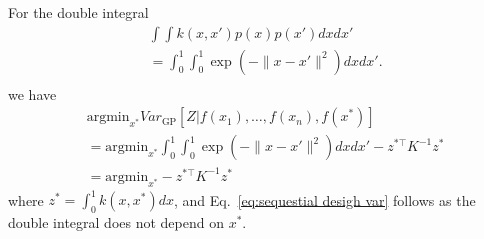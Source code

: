 For the double integral
\begin{align}
    & \int \int k(x,x')p(x)p(x')dxdx' \\
    & = \int_0^1 \int_0^1 \exp(-\|x - x'\|^2) dx dx'. \\
\label{eq:double-integral}
\end{align}
we have
\begin{align}
    & \mbox{argmin}_{x^*} Var_{\mbox{GP}}\left[Z | f(x_1), \ldots, f(x_n), f(x^*) \right]  \\
    & = \mbox{argmin}_{x^*}  \int_0^1 \int_0^1 \exp(-\|x - x'\|^2) dx dx' - z^{*\top}K^{-1}z^* \\
 & = \mbox{argmin}_{x^*}  - z^{*\top}K^{-1}z^*
 \label{eq:sequestial desigh var}
\end{align}
where $z^* = \int_0^1 k(x, x^*) dx$, and Eq.~\eqref{eq:sequestial desigh var} follows as the double integral does not depend on $x^*$. \\


